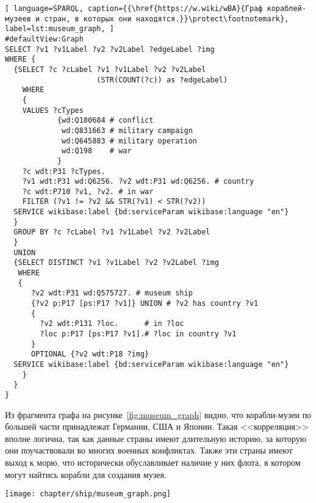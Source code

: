 \begin{lstlisting}[ language=SPARQL, caption={{\href{https://w.wiki/wBA}{Граф кораблей-музеев и стран, в которых они находятся.}}\protect\footnotemark}, label=lst:museum_graph, ]
#defaultView:Graph    
SELECT ?v1 ?v1Label ?v2 ?v2Label ?edgeLabel ?img 
WHERE {
  {SELECT ?c ?cLabel ?v1 ?v1Label ?v2 ?v2Label 
                     (STR(COUNT(?c)) as ?edgeLabel) 
    WHERE
    {
    VALUES ?cTypes 
            {wd:Q180684 # conflict
             wd:Q831663 # military campaign
             wd:Q645883 # military operation
             wd:Q198    # war
            } 
    ?c wdt:P31 ?cTypes.
    ?v1 wdt:P31 wd:Q6256. ?v2 wdt:P31 wd:Q6256. # country
    ?c wdt:P710 ?v1, ?v2. # in war
    FILTER (?v1 != ?v2 && STR(?v1) < STR(?v2)) 
  SERVICE wikibase:label {bd:serviceParam wikibase:language "en"}
  }
  GROUP BY ?c ?cLabel ?v1 ?v1Label ?v2 ?v2Label
  }
  UNION
  {SELECT DISTINCT ?v1 ?v1Label ?v2 ?v2Label ?img
   WHERE
   {
      ?v2 wdt:P31 wd:Q575727. # museum ship
      {?v2 p:P17 [ps:P17 ?v1]} UNION # ?v2 has country ?v1
      {
        ?v2 wdt:P131 ?loc.      # in ?loc
        ?loc p:P17 [ps:P17 ?v1].# ?loc in country ?v1
      }
      OPTIONAL {?v2 wdt:P18 ?img}
  SERVICE wikibase:label {bd:serviceParam wikibase:language "en"}
    }
  }
}
\end{lstlisting}

Из фрагмента графа на рисунке~\ref{fig:museum_graph} видно, что корабли-музеи по большей части принадлежат Германии, США и Японии. Такая <<корреляция>> вполне логична, так как данные страны имеют длительную историю, за которую они поучаствовали во многих военных конфликтах. Также эти страны имеют выход к морю, что исторически обуславливает наличие у них флота, в котором могут найтись корабли для создания музея.

\begin{figure*}[ht]
  \texttt{[image: chapter/ship/museum\_graph.png]}
  \caption[Граф стран и кораблей-музеев]{Фрагмент графа стран, кораблей-музеев и конфликтов, построенный по скрипту в листинге~\protect\ref{lst:museum_graph}.}%
  \label{fig:museum_graph}%
\end{figure*}

